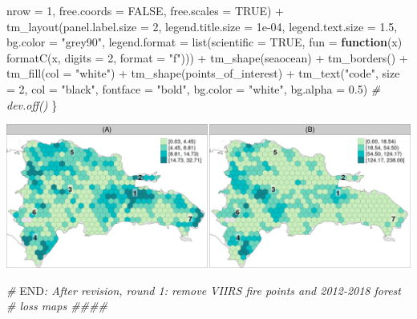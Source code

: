 \documentclass[10pt,landscape,a3paper]{article}
\newenvironment{Shaded}{\begin{snugshade}}{\end{snugshade}}
\newcommand{\AttributeTok}[1]{\textcolor[rgb]{0.77,0.63,0.00}{#1}}
\newcommand{\CommentTok}[1]{\textcolor[rgb]{0.56,0.35,0.01}{\textit{#1}}}
\newcommand{\ConstantTok}[1]{\textcolor[rgb]{0.00,0.00,0.00}{#1}}
\newcommand{\ControlFlowTok}[1]{\textcolor[rgb]{0.13,0.29,0.53}{\textbf{#1}}}
\newcommand{\DecValTok}[1]{\textcolor[rgb]{0.00,0.00,0.81}{#1}}
\newcommand{\FloatTok}[1]{\textcolor[rgb]{0.00,0.00,0.81}{#1}}
\newcommand{\FunctionTok}[1]{\textcolor[rgb]{0.00,0.00,0.00}{#1}}
\newcommand{\NormalTok}[1]{#1}
\newcommand{\RegionMarkerTok}[1]{#1}
\newcommand{\SpecialCharTok}[1]{\textcolor[rgb]{0.00,0.00,0.00}{#1}}
\newcommand{\StringTok}[1]{\textcolor[rgb]{0.31,0.60,0.02}{#1}}
\begin{document}
\begin{Shaded}
\begin{Highlighting}[]
        \AttributeTok{nrow =} \DecValTok{1}\NormalTok{, }\AttributeTok{free.coords =} \ConstantTok{FALSE}\NormalTok{, }\AttributeTok{free.scales =} \ConstantTok{TRUE}\NormalTok{) }\SpecialCharTok{+} \FunctionTok{tm\_layout}\NormalTok{(}\AttributeTok{panel.label.size =} \DecValTok{2}\NormalTok{,}
        \AttributeTok{legend.title.size =} \FloatTok{1e{-}04}\NormalTok{, }\AttributeTok{legend.text.size =} \FloatTok{1.5}\NormalTok{, }\AttributeTok{bg.color =} \StringTok{"grey90"}\NormalTok{, }\AttributeTok{legend.format =} \FunctionTok{list}\NormalTok{(}\AttributeTok{scientific =} \ConstantTok{TRUE}\NormalTok{,}
            \AttributeTok{fun =} \ControlFlowTok{function}\NormalTok{(x) }\FunctionTok{formatC}\NormalTok{(x, }\AttributeTok{digits =} \DecValTok{2}\NormalTok{, }\AttributeTok{format =} \StringTok{"f"}\NormalTok{))) }\SpecialCharTok{+} \FunctionTok{tm\_shape}\NormalTok{(seaocean) }\SpecialCharTok{+}
        \FunctionTok{tm\_borders}\NormalTok{() }\SpecialCharTok{+} \FunctionTok{tm\_fill}\NormalTok{(}\AttributeTok{col =} \StringTok{"white"}\NormalTok{) }\SpecialCharTok{+} \FunctionTok{tm\_shape}\NormalTok{(points\_of\_interest) }\SpecialCharTok{+} \FunctionTok{tm\_text}\NormalTok{(}\StringTok{"code"}\NormalTok{,}
        \AttributeTok{size =} \DecValTok{2}\NormalTok{, }\AttributeTok{col =} \StringTok{"black"}\NormalTok{, }\AttributeTok{fontface =} \StringTok{"bold"}\NormalTok{, }\AttributeTok{bg.color =} \StringTok{"white"}\NormalTok{, }\AttributeTok{bg.alpha =} \FloatTok{0.5}\NormalTok{)}
    \CommentTok{\# dev.off()}
\NormalTok{\}}
\end{Highlighting}
\end{Shaded}

\begin{center}\includegraphics{img/modelling/lta-esda-19} \end{center}

\begin{Shaded}
\begin{Highlighting}[]
\CommentTok{\# }\RegionMarkerTok{END}\CommentTok{: After revision, round 1: remove VIIRS fire points and 2012{-}2018 forest}
\CommentTok{\# loss maps \#\#\#\#}
\end{Highlighting}
\end{Shaded}
\end{document}
